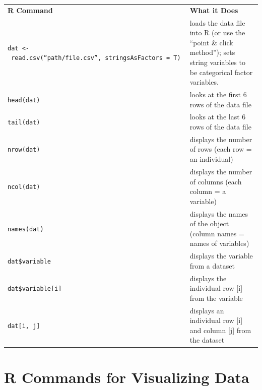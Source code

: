 \documentclass[
  letterpaper,
  DIV=11,
  numbers=noendperiod,
  oneside]{scrreprt}
\begin{document}
\begin{longtable}[]{@{}
  >{\raggedright\arraybackslash}p{}
  >{\raggedright\arraybackslash}p{}@{}}
\toprule\noalign{}
\endhead
\bottomrule\noalign{}
\endlastfoot
\textbf{R Command} & \textbf{What it Does} \\
\texttt{dat\ \textless{}-\ read.csv(“path/file.csv”,\ stringsAsFactors\ =\ T)}
& loads the data file into R (or use the ``point \& click method'');
sets string variables to be categorical factor variables. \\
\texttt{head(dat)} & looks at the first 6 rows of the data file \\
\texttt{tail(dat)} & looks at the last 6 rows of the data file \\
\texttt{nrow(dat)} & displays the number of rows (each row = an
individual) \\
\texttt{ncol(dat)} & displays the number of columns (each column = a
variable) \\
\texttt{names(dat)} & displays the names of the object (column names =
names of variables) \\
\texttt{dat\$variable} & displays the variable from a dataset \\
\texttt{dat\$variable{[}i{]}} & displays the individual row {[}i{]} from
the variable \\
\texttt{dat{[}i,\ j{]}} & displays an individual row {[}i{]} and column
{[}j{]} from the dataset \\
\end{longtable}

\section{R Commands for Visualizing
Data}\label{r-commands-for-visualizing-data}
\end{document}
